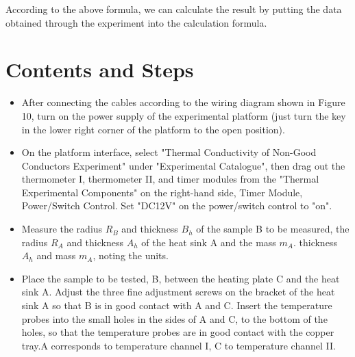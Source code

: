 \documentclass[UTF8]{article}
\begin{document}
   According to the above formula, we can calculate the result by putting the data obtained through the experiment into the calculation formula.

	\section{Contents and Steps}
	
	\begin{itemize}
		\item After connecting the cables according to the wiring diagram shown in Figure 10, turn on the power supply of the experimental platform (just turn the key in the lower right corner of the platform to the open position).
		\item On the platform interface, select "Thermal Conductivity of Non-Good Conductors Experiment" under "Experimental Catalogue", then drag out the thermometer I, thermometer II, and timer modules from the "Thermal Experimental Components" on the right-hand side, Timer Module, Power/Switch Control. Set "DC12V" on the power/switch control to "on".
		\item Measure the radius $R_{B}$ and thickness $B_{h}$ of the sample B to be measured, the radius $R_{A}$ and thickness $A_{h}$ of the heat sink A and the mass $m_{A}$. thickness $A_{h}$ and mass $m_{A}$, noting the units.
		\item Place the sample to be tested, B, between the heating plate C and the heat sink A. Adjust the three fine adjustment screws on the bracket of the heat sink A so that B is in good contact with A and C. Insert the temperature probes into the small holes in the sides of A and C, to the bottom of the holes, so that the temperature probes are in good contact with the copper tray.A corresponds to temperature channel I, C to temperature channel II.
	\end{itemize}
     
\end{document}
